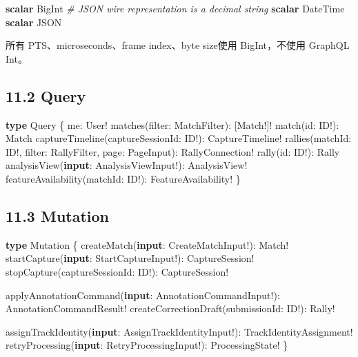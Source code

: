 \documentclass[
  9pt,
  a4paper,
]{article}
\newenvironment{Shaded}{}{}
\newcommand{\CommentTok}[1]{\textcolor[rgb]{0.38,0.63,0.69}{\textit{#1}}}
\newcommand{\DataTypeTok}[1]{\textcolor[rgb]{0.56,0.13,0.00}{#1}}
\newcommand{\KeywordTok}[1]{\textcolor[rgb]{0.00,0.44,0.13}{\textbf{#1}}}
\newcommand{\NormalTok}[1]{#1}
\begin{document}
\begin{Shaded}
\begin{Highlighting}[]
\KeywordTok{scalar}\NormalTok{ BigInt }\CommentTok{\# JSON wire representation is a decimal string}
\KeywordTok{scalar}\NormalTok{ DateTime}
\KeywordTok{scalar}\NormalTok{ JSON}
\end{Highlighting}
\end{Shaded}

所有 PTS、microseconds、frame index、byte size使用 BigInt，不使用
GraphQL Int。

\subsection{11.2 Query}\label{112-query}

\begin{Shaded}
\begin{Highlighting}[]
\KeywordTok{type}\NormalTok{ Query \{}
\NormalTok{  me: User!}
\NormalTok{  matches(filter: MatchFilter): [Match!]!}
\NormalTok{  match(id: }\DataTypeTok{ID}\NormalTok{!): Match}
\NormalTok{  captureTimeline(captureSessionId: }\DataTypeTok{ID}\NormalTok{!): CaptureTimeline!}
\NormalTok{  rallies(matchId: }\DataTypeTok{ID}\NormalTok{!, filter: RallyFilter, page: PageInput): RallyConnection!}
\NormalTok{  rally(id: }\DataTypeTok{ID}\NormalTok{!): Rally}
\NormalTok{  analysisView(}\KeywordTok{input}\NormalTok{: AnalysisViewInput!): AnalysisView!}
\NormalTok{  featureAvailability(matchId: }\DataTypeTok{ID}\NormalTok{!): FeatureAvailability!}
\NormalTok{\}}
\end{Highlighting}
\end{Shaded}

\subsection{11.3 Mutation}\label{113-mutation}

\begin{Shaded}
\begin{Highlighting}[]
\KeywordTok{type}\NormalTok{ Mutation \{}
\NormalTok{  createMatch(}\KeywordTok{input}\NormalTok{: CreateMatchInput!): Match!}
\NormalTok{  startCapture(}\KeywordTok{input}\NormalTok{: StartCaptureInput!): CaptureSession!}
\NormalTok{  stopCapture(captureSessionId: }\DataTypeTok{ID}\NormalTok{!): CaptureSession!}

\NormalTok{  applyAnnotationCommand(}\KeywordTok{input}\NormalTok{: AnnotationCommandInput!): AnnotationCommandResult!}
\NormalTok{  createCorrectionDraft(submissionId: }\DataTypeTok{ID}\NormalTok{!): Rally!}

\NormalTok{  assignTrackIdentity(}\KeywordTok{input}\NormalTok{: AssignTrackIdentityInput!): TrackIdentityAssignment!}
\NormalTok{  retryProcessing(}\KeywordTok{input}\NormalTok{: RetryProcessingInput!): ProcessingState!}
\NormalTok{\}}
\end{Highlighting}
\end{Shaded}
\end{document}
